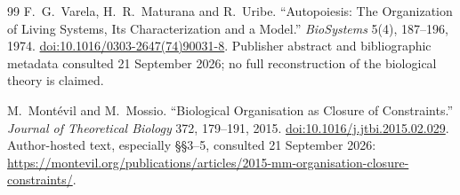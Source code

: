 \begin{thebibliography}{99}
 F.~G.~Varela, H.~R.~Maturana and R.~Uribe. ``Autopoiesis: The Organization of Living Systems, Its Characterization and a Model.'' \textit{BioSystems} 5(4), 187--196, 1974. \href{https://doi.org/10.1016/0303-2647(74)90031-8}{doi:10.1016/0303-2647(74)90031-8}. Publisher abstract and bibliographic metadata consulted 21 September 2026; no full reconstruction of the biological theory is claimed.

 M.~Mont\'evil and M.~Mossio. ``Biological Organisation as Closure of Constraints.'' \textit{Journal of Theoretical Biology} 372, 179--191, 2015. \href{https://doi.org/10.1016/j.jtbi.2015.02.029}{doi:10.1016/j.jtbi.2015.02.029}. Author-hosted text, especially \S\S3--5, consulted 21 September 2026: \url{https://montevil.org/publications/articles/2015-mm-organisation-closure-constraints/}.
\end{thebibliography}
